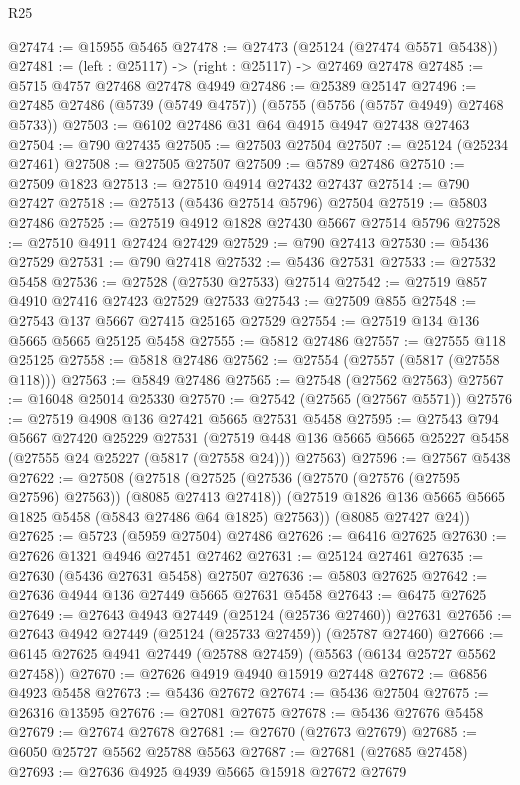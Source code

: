 \begin{lexlean}{R25}
\begin{coremodule}
@27474 := @15955 @5465
@27478 := @27473 (@25124 (@27474 @5571 @5438))
@27481 := (left : @25117) -> (right : @25117) -> @27469 @27478
@27485 := @5715 @4757 @27468 @27478 @4949
@27486 := @25389 @25147
@27496 := @27485 @27486 (@5739 (@5749 @4757)) (@5755 (@5756 (@5757 @4949) @27468 @5733))
@27503 := @6102 @27486 @31 @64 @4915 @4947 @27438 @27463
@27504 := @790 @27435
@27505 := @27503 @27504
@27507 := @25124 (@25234 @27461)
@27508 := @27505 @27507
@27509 := @5789 @27486
@27510 := @27509 @1823
@27513 := @27510 @4914 @27432 @27437
@27514 := @790 @27427
@27518 := @27513 (@5436 @27514 @5796) @27504
@27519 := @5803 @27486
@27525 := @27519 @4912 @1828 @27430 @5667 @27514 @5796
@27528 := @27510 @4911 @27424 @27429
@27529 := @790 @27413
@27530 := @5436 @27529
@27531 := @790 @27418
@27532 := @5436 @27531
@27533 := @27532 @5458
@27536 := @27528 (@27530 @27533) @27514
@27542 := @27519 @857 @4910 @27416 @27423 @27529 @27533
@27543 := @27509 @855
@27548 := @27543 @137 @5667 @27415 @25165 @27529
@27554 := @27519 @134 @136 @5665 @5665 @25125 @5458
@27555 := @5812 @27486
@27557 := @27555 @118 @25125
@27558 := @5818 @27486
@27562 := @27554 (@27557 (@5817 (@27558 @118)))
@27563 := @5849 @27486
@27565 := @27548 (@27562 @27563)
@27567 := @16048 @25014 @25330
@27570 := @27542 (@27565 (@27567 @5571))
@27576 := @27519 @4908 @136 @27421 @5665 @27531 @5458
@27595 := @27543
    @794
    @5667
    @27420
    @25229
    @27531
    (@27519 @448 @136 @5665 @5665 @25227 @5458 (@27555 @24 @25227 (@5817 (@27558 @24))) @27563)
@27596 := @27567 @5438
@27622 := @27508
    (@27518
      (@27525
        (@27536 (@27570 (@27576 (@27595 @27596) @27563)) (@8085 @27413 @27418))
        (@27519 @1826 @136 @5665 @5665 @1825 @5458 (@5843 @27486 @64 @1825) @27563))
      (@8085 @27427 @24))
@27625 := @5723 (@5959 @27504) @27486
@27626 := @6416 @27625
@27630 := @27626 @1321 @4946 @27451 @27462
@27631 := @25124 @27461
@27635 := @27630 (@5436 @27631 @5458) @27507
@27636 := @5803 @27625
@27642 := @27636 @4944 @136 @27449 @5665 @27631 @5458
@27643 := @6475 @27625
@27649 := @27643 @4943 @27449 (@25124 (@25736 @27460)) @27631
@27656 := @27643 @4942 @27449 (@25124 (@25733 @27459)) (@25787 @27460)
@27666 := @6145 @27625 @4941 @27449 (@25788 @27459) (@5563 (@6134 @25727 @5562 @27458))
@27670 := @27626 @4919 @4940 @15919 @27448
@27672 := @6856 @4923 @5458
@27673 := @5436 @27672
@27674 := @5436 @27504
@27675 := @26316 @13595
@27676 := @27081 @27675
@27678 := @5436 @27676 @5458
@27679 := @27674 @27678
@27681 := @27670 (@27673 @27679)
@27685 := @6050 @25727 @5562 @25788 @5563
@27687 := @27681 (@27685 @27458)
@27693 := @27636 @4925 @4939 @5665 @15918 @27672 @27679

\end{coremodule}
\end{lexlean}
